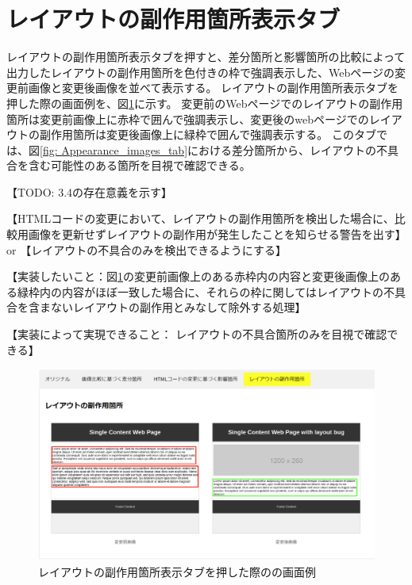 \section{レイアウトの副作用箇所表示タブ}\label{sec:subeffect_tab}
レイアウトの副作用箇所表示タブを押すと、差分箇所と影響箇所の比較によって出力したレイアウトの副作用箇所を色付きの枠で強調表示した、Webページの変更前画像と変更後画像を並べて表示する。
レイアウトの副作用箇所表示タブを押した際の画面例を、図\ref{fig: Appearance_subEffect_tab}に示す。
変更前のWebページでのレイアウトの副作用箇所は変更前画像上に赤枠で囲んで強調表示し、変更後のwebページでのレイアウトの副作用箇所は変更後画像上に緑枠で囲んで強調表示する。
このタブでは、図\ref{fig: Appearance_images_tab}における差分箇所から、レイアウトの不具合を含む可能性のある箇所を目視で確認できる。
\par
【TODO: 3.4の存在意義を示す】
\par
【HTMLコードの変更において、レイアウトの副作用箇所を検出した場合に、比較用画像を更新せずレイアウトの副作用が発生したことを知らせる警告を出す】
or
【レイアウトの不具合のみを検出できるようにする】
\par
【実装したいこと：図\ref{fig: Appearance_subEffect_tab}の変更前画像上のある赤枠内の内容と変更後画像上のある緑枠内の内容がほぼ一致した場合に、それらの枠に関してはレイアウトの不具合を含まないレイアウトの副作用とみなして除外する処理】
\par
【実装によって実現できること： レイアウトの不具合箇所のみを目視で確認できる】
\begin{figure}[tp]
    \begin{center}
        \includegraphics[width=1.0\columnwidth]{image/3_subEffect_tab.png}
        \caption{レイアウトの副作用箇所表示タブを押した際の\toolName の画面例}
        \label{fig: Appearance_subEffect_tab}
    \end{center}
\end{figure}

